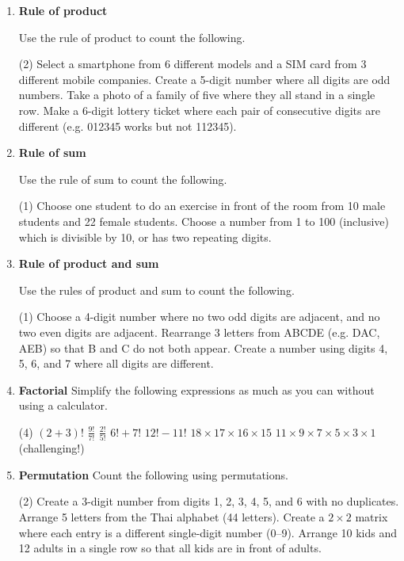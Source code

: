 \begin{enumerate}
\item \textbf{Rule of product} 

Use the rule of product to count the following.
\begin{tasks}[after-skip = 40pt, after-item-skip = 40pt](2)
\task Select a smartphone from 6 different models and a SIM card from 3 different mobile companies.
\task Create a 5-digit number where all digits are odd numbers.
\task Take a photo of a family of five where they all stand in a single row.
\task Make a 6-digit lottery ticket where each pair of consecutive digits are different (e.g. 012345 works but not 112345).
\end{tasks}


\item \textbf{Rule of sum} 

Use the rule of sum to count the following.
\begin{tasks}[after-skip = 30pt, after-item-skip = 30pt](1)
\task Choose one student to do an exercise in front of the room from 10 male students and 22 female students.
\task Choose a number from 1 to 100 (inclusive) which is divisible by 10, or has two repeating digits.
\end{tasks}

\item \textbf{Rule of product and sum} 

Use the rules of product and sum to count the following.
\begin{tasks}[after-skip = 80pt, after-item-skip = 80pt](1)
\task Choose a 4-digit number where no two odd digits are adjacent, and no two even digits are adjacent.
\task Rearrange 3 letters from ABCDE (e.g. DAC, AEB) so that B and C do not both appear.
\task Create a number using digits 4, 5, 6, and 7 where all digits are different.
\end{tasks}

\newpage
\item \textbf{Factorial}  Simplify the following expressions as much as you can without using a calculator.
\begin{tasks}[after-skip = 50pt, after-item-skip = 50pt](4)
\task $(2+3)!$
\task $\frac{9!}{7!}$
\task $\frac{2!}{5!}$
\task $6! + 7!$
\task $12! - 11!$
\task $18 \times 17 \times 16 \times 15$
\task* $11 \times 9 \times 7 \times 5 \times 3 \times 1$ (challenging!)
\end{tasks}

\item \textbf{Permutation} Count the following using permutations. 
\begin{tasks}[after-skip = 50pt, after-item-skip = 50pt](2)
\task Create a 3-digit number from digits 1, 2, 3, 4, 5, and 6 with no duplicates.
\task Arrange 5 letters from the Thai alphabet (44 letters).
\task Create a $2\times 2$ matrix where each entry is a different single-digit number (0--9).
\task Arrange 10 kids and 12 adults in a single row so that all kids are in front of adults.
\end{tasks}


\end{enumerate}
